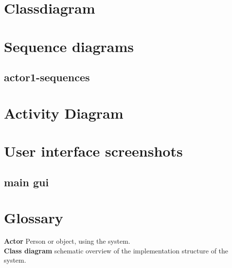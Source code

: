 \appendix

\chapter{Classdiagram}
\label{chap:clasdiag}
\thispagestyle{fancy}
\begin{center}
\end{center}

\chapter{Sequence diagrams}
\label{chap:seqdiag}
\thispagestyle{fancy}

\section{actor1-sequences}
\begin{center}
\end{center}

\chapter{Activity Diagram}
\label{chap:actdiag}
\thispagestyle{fancy}
\begin{center}
\end{center}

\chapter{User interface screenshots}
\label{chap:usint}
\thispagestyle{fancy}
\section{main gui}
\label{sec:mgblogin}
\begin{center}
\end{center}

\chapter{Glossary}
\thispagestyle{fancy}
\textbf{Actor} Person or object, using the system.\\
\textbf{Class diagram} schematic overview of the implementation structure of the system.\\
